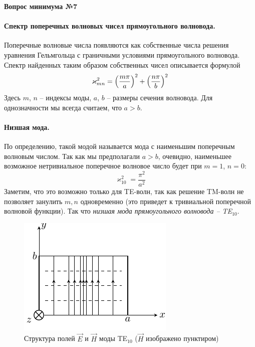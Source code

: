\documentclass[a4paper,14pt]{extarticle}
\newcommand{\ticket}[1] {
\newpage
\hypertarget{num#1}{}
\begin{center}
	\textbf{Вопрос минимума №#1 }
\end{center}
}
\begin{document}
\ticket{7}
\paragraph{Спектр поперечных волновых чисел прямоугольного волновода. } Поперечные волновые числа появляются как собственные числа решения уравнения Гельмгольца с граничными условиями прямоугольного волновода. Спектр найденных таким образом собственных чисел описывается формулой
\begin{equation}
	\varkappa^2_{mn} = \qty(\frac{m\pi}{a})^2+
		\qty(\frac{n\pi}{b})^2
\end{equation}
Здесь $m$, $n$ -- индексы моды, $a$, $b$ -- размеры сечения волновода. Для однозначности мы всегда считаем, что $a>b$.

\paragraph{Низшая мода.} По определению, такой модой называется мода с наименьшим поперечным волновым числом. Так как мы предполагали $a>b$, очевидно, наименьшее возможное нетривиальное поперечное волновое число будет при $m=1$, $n=0$:
\begin{equation}
	\varkappa^2_{10} = \frac{\pi^2}{a^2}
\end{equation}
Заметим, что это возможно только для TE-волн, так как решение TM-волн не позволяет занулить $m,n$ одновременно (это приведет к тривиальной поперечной волновой функции). Так что \textit{низшая мода прямоугольного волновода -- TE${}_{10}$}.
\begin{figure}[h!]
	\centering
	\includegraphics[scale=1.5]{img/lect4_ris8} 
	\caption{Структура полей $\vec{E}$ и $\vec{H}$ моды TE${}_{10}$ ($\vec{H}$ изображено пунктиром)}
	\label{fig:lect4:8}
\end{figure}
\end{document}

